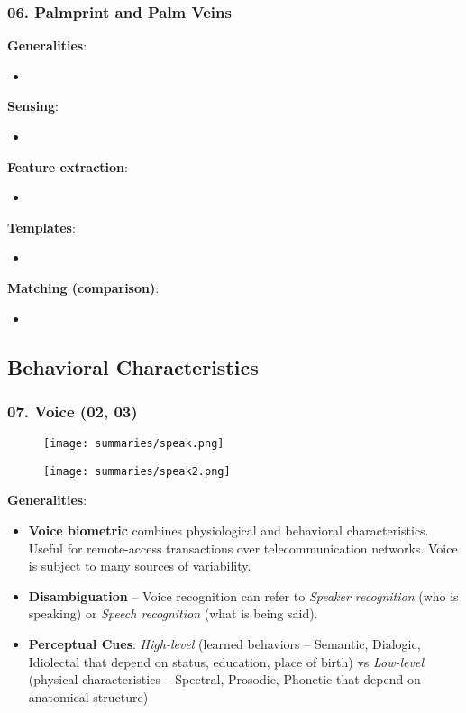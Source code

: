 \documentclass[a4paper]{article}
\begin{document}
    \subsubsection*{06. Palmprint and Palm Veins}
      \textbf{Generalities}:
      \begin{itemize}
        \item 
      \end{itemize}

      \textbf{Sensing}:
      \begin{itemize}
        \item 
      \end{itemize}

      \textbf{Feature extraction}:
      \begin{itemize}
        \item 
      \end{itemize}

      \textbf{Templates}:
      \begin{itemize}
        \item 
      \end{itemize}

      \textbf{Matching (comparison)}:
      \begin{itemize}
        \item 
      \end{itemize}
      \newpage
  \subsection*{Behavioral Characteristics}
    \subsubsection*{07. Voice (02, 03)}
      \begin{figure}[htp]
        \centering
          \texttt{[image: summaries/speak.png]}
      \end{figure}
      \begin{figure}[htp]
        \centering
          \texttt{[image: summaries/speak2.png]}
      \end{figure}
      \textbf{Generalities}:
      \begin{itemize}
        \item \textbf{Voice biometric} combines physiological and behavioral characteristics. Useful for remote-access transactions over telecommunication networks. Voice is subject to many sources of variability.
        \item \textbf{Disambiguation} -- Voice recognition can refer to \emph{Speaker recognition} (who is speaking) or \emph{Speech recognition} (what is being said).
        \item \textbf{Perceptual Cues}: \emph{High-level} (learned behaviors -- Semantic, Dialogic, Idiolectal that depend on status, education, place of birth) vs \emph{Low-level} (physical characteristics -- Spectral, Prosodic, Phonetic that depend on anatomical structure)
      \end{itemize}
\end{document}
